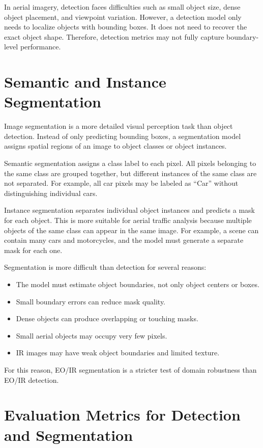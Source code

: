 In aerial imagery, detection faces difficulties such as small object size, dense object placement, and viewpoint variation. However, a detection model only needs to localize objects with bounding boxes. It does not need to recover the exact object shape. Therefore, detection metrics may not fully capture boundary-level performance.

\section{Semantic and Instance Segmentation}

Image segmentation is a more detailed visual perception task than object detection. Instead of only predicting bounding boxes, a segmentation model assigns spatial regions of an image to object classes or object instances.

Semantic segmentation assigns a class label to each pixel. All pixels belonging to the same class are grouped together, but different instances of the same class are not separated. For example, all car pixels may be labeled as ``Car'' without distinguishing individual cars.

Instance segmentation separates individual object instances and predicts a mask for each object. This is more suitable for aerial traffic analysis because multiple objects of the same class can appear in the same image. For example, a scene can contain many cars and motorcycles, and the model must generate a separate mask for each one.

Segmentation is more difficult than detection for several reasons:

\begin{itemize}
    \item The model must estimate object boundaries, not only object centers or boxes.
    \item Small boundary errors can reduce mask quality.
    \item Dense objects can produce overlapping or touching masks.
    \item Small aerial objects may occupy very few pixels.
    \item IR images may have weak object boundaries and limited texture.
\end{itemize}

For this reason, EO/IR segmentation is a stricter test of domain robustness than EO/IR detection.

\section{Evaluation Metrics for Detection and Segmentation}

